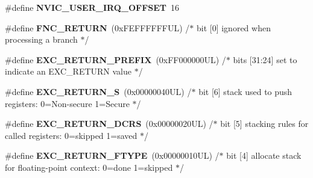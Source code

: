 \begin{DoxyCompactItemize}
\mbox{\label{group___c_m_s_i_s___core___n_v_i_c_functions_ga8045d905a5ca57437d8e6f71ffcb6df5}} 
\#define {\bfseries N\+V\+I\+C\+\_\+\+U\+S\+E\+R\+\_\+\+I\+R\+Q\+\_\+\+O\+F\+F\+S\+ET}~16
\item 
\mbox{\label{group___c_m_s_i_s___core___n_v_i_c_functions_gabaa62910bf89acc186ae998c611e64ab}} 
\#define {\bfseries F\+N\+C\+\_\+\+R\+E\+T\+U\+RN}~(0x\+F\+E\+F\+F\+F\+F\+F\+F\+U\+L)     /$\ast$ bit \mbox{[}0\mbox{]} ignored when processing a branch                             $\ast$/
\item 
\mbox{\label{group___c_m_s_i_s___core___n_v_i_c_functions_ga99e0c1c19f050880a8bd827a7f420bec}} 
\#define {\bfseries E\+X\+C\+\_\+\+R\+E\+T\+U\+R\+N\+\_\+\+P\+R\+E\+F\+IX}~(0x\+F\+F000000\+U\+L)     /$\ast$ bits \mbox{[}31\+:24\mbox{]} set to indicate an E\+X\+C\+\_\+\+R\+E\+T\+U\+R\+N value                     $\ast$/
\item 
\mbox{\label{group___c_m_s_i_s___core___n_v_i_c_functions_ga88711355d0196b1ffeb18c33e2c95360}} 
\#define {\bfseries E\+X\+C\+\_\+\+R\+E\+T\+U\+R\+N\+\_\+S}~(0x00000040\+U\+L)     /$\ast$ bit \mbox{[}6\mbox{]} stack used to push registers\+: 0=\+Non-\/secure 1=\+Secure          $\ast$/
\item 
\mbox{\label{group___c_m_s_i_s___core___n_v_i_c_functions_ga0a0f2c03b4aef2c02bdae044bda1324b}} 
\#define {\bfseries E\+X\+C\+\_\+\+R\+E\+T\+U\+R\+N\+\_\+\+D\+C\+RS}~(0x00000020\+U\+L)     /$\ast$ bit \mbox{[}5\mbox{]} stacking rules for called registers\+: 0=skipped 1=saved       $\ast$/
\item 
\mbox{\label{group___c_m_s_i_s___core___n_v_i_c_functions_ga342b51c3eec59822bf206e24ef881a9e}} 
\#define {\bfseries E\+X\+C\+\_\+\+R\+E\+T\+U\+R\+N\+\_\+\+F\+T\+Y\+PE}~(0x00000010\+U\+L)     /$\ast$ bit \mbox{[}4\mbox{]} allocate stack for floating-\/point context\+: 0=done 1=skipped  $\ast$/
\item 
\mbox{\label{group___c_m_s_i_s___core___n_v_i_c_functions_gabb65f847769a7807395b2739cc9702d0}} 

\end{DoxyCompactItemize}
